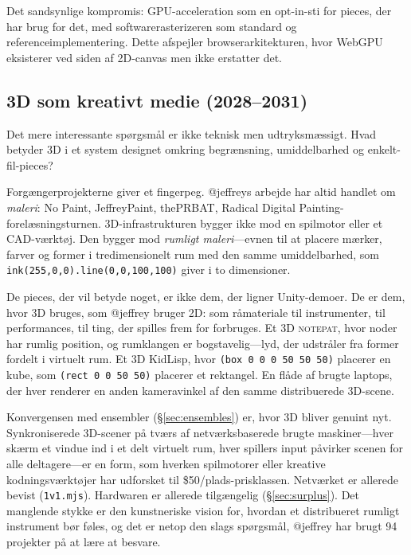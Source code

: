 \documentclass[10pt,letterpaper,twocolumn]{article}
\newcommand{\np}{\textsc{notepat}}
\begin{document}
Det sandsynlige kompromis: GPU-acceleration som en opt-in-sti for pieces, der har brug for det, med softwarerasterizeren som standard og referenceimplementering. Dette afspejler browserarkitekturen, hvor WebGPU eksisterer ved siden af 2D-canvas men ikke erstatter det.

\subsection{3D som kreativt medie (2028--2031)}

Det mere interessante spørgsmål er ikke teknisk men udtryksmæssigt. Hvad betyder 3D i et system designet omkring begrænsning, umiddelbarhed og enkelt-fil-pieces?

Forgængerprojekterne giver et fingerpeg. @jeffreys arbejde har altid handlet om \emph{maleri}: No Paint, JeffreyPaint, thePRBAT, Radical Digital Painting-forelæsningsturnen. 3D-infrastrukturen bygger ikke mod en spilmotor eller et CAD-værktøj. Den bygger mod \emph{rumligt maleri}---evnen til at placere mærker, farver og former i tredimensionelt rum med den samme umiddelbarhed, som \texttt{ink(255,0,0).line(0,0,100,100)} giver i to dimensioner.

De pieces, der vil betyde noget, er ikke dem, der ligner Unity-demoer. De er dem, hvor 3D bruges, som @jeffrey bruger 2D: som råmateriale til instrumenter, til performances, til ting, der spilles frem for forbruges. Et 3D \np{}, hvor noder har rumlig position, og rumklangen er bogstavelig---lyd, der udstråler fra former fordelt i virtuelt rum. Et 3D KidLisp, hvor \texttt{(box 0 0 0 50 50 50)} placerer en kube, som \texttt{(rect 0 0 50 50)} placerer et rektangel. En flåde af brugte laptops, der hver renderer en anden kameravinkel af den samme distribuerede 3D-scene.

Konvergensen med ensembler (\S\ref{sec:ensembles}) er, hvor 3D bliver genuint nyt. Synkroniserede 3D-scener på tværs af netværksbaserede brugte maskiner---hver skærm et vindue ind i et delt virtuelt rum, hver spillers input påvirker scenen for alle deltagere---er en form, som hverken spilmotorer eller kreative kodningsværktøjer har udforsket til \$50/plads-prisklassen. Netværket er allerede bevist (\texttt{1v1.mjs}). Hardwaren er allerede tilgængelig (\S\ref{sec:surplus}). Det manglende stykke er den kunstneriske vision for, hvordan et distribueret rumligt instrument bør føles, og det er netop den slags spørgsmål, @jeffrey har brugt 94 projekter på at lære at besvare.

\end{document}
